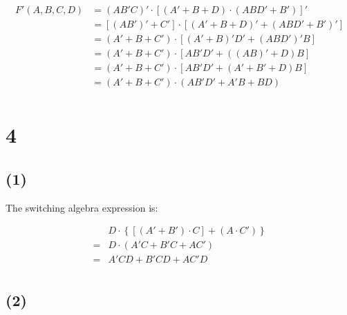 \documentclass{article}
\begin{document}
\begin{align*}
    F'(A, B, C, D) &= (AB'C)' \cdot \left[(A' + B + D) \cdot (ABD' + B')\right]' \\
    &= \left[\left(AB'\right)' + C' \right] \cdot \left[\left(A' + B + D\right)' + \left(ABD' + B'\right)'\right] \\
    &= \left( A' + B + C' \right) \cdot \left[\left(A' + B\right)'D' + \left(ABD'\right)'B\right] \\
    &= \left( A' + B + C' \right) \cdot \left[ AB'D' + \left(\left(AB\right)' + D\right)B\right] \\
    &= \left( A' + B + C' \right) \cdot \left[ AB'D' + \left(A' + B' + D\right)B\right] \\
    &= \left( A' + B + C' \right) \cdot \left( AB'D' + A'B + BD\right) \\
\end{align*}

\newpage

\section*{4}

\subsection*{(1)}

The switching algebra expression is:

\begin{align*}
    &D \cdot \left\{\left[ (A' + B') \cdot C \right] + (A \cdot C') \right\} \\
    =& D \cdot (A'C + B'C + AC') \\
    =& A'CD + B'CD + AC'D \\
\end{align*}

\subsection*{(2)}
\end{document}

